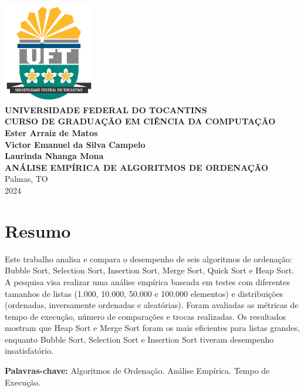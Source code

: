 \documentclass[12pt, a4paper]{report}
\begin{document}
\begin{titlepage}
    \centering
    \includegraphics[width=0.3\textwidth]{uft_logo.png}\\[1cm]
    \vspace{1cm}
    \textbf{\Large UNIVERSIDADE FEDERAL DO TOCANTINS}\\[0.5cm]
    \textbf{\large CURSO DE GRADUAÇÃO EM CIÊNCIA DA COMPUTAÇÃO}\\[2cm]
    
    \textbf{\large Ester Arraiz de Matos\\Victor Emanuel da Silva Campelo\\Laurinda Nhanga Mona}\\[2cm]
    
    \textbf{\LARGE ANÁLISE EMPÍRICA DE ALGORITMOS DE ORDENAÇÃO}\\[7cm]
    
    Palmas, TO\\
    2024
    
\end{titlepage}

\chapter*{Resumo}
Este trabalho analisa e compara o desempenho de seis algoritmos de ordenação: Bubble Sort, Selection Sort, Insertion Sort, Merge Sort, Quick Sort e Heap Sort. A pesquisa visa realizar uma análise empírica baseada em testes com diferentes tamanhos de listas (1.000, 10.000, 50.000 e 100.000 elementos) e distribuições (ordenadas, inversamente ordenadas e aleatórias). Foram avaliadas as métricas de tempo de execução, número de comparações e trocas realizadas. Os resultados mostram que Heap Sort e Merge Sort foram os mais eficientes para listas grandes, enquanto Bubble Sort, Selection Sort e Insertion Sort tiveram desempenho insatisfatório.

\vspace{0.5cm}

\textbf{Palavras-chave:} Algoritmos de Ordenação. Análise Empírica. Tempo de Execução.
\end{document}
